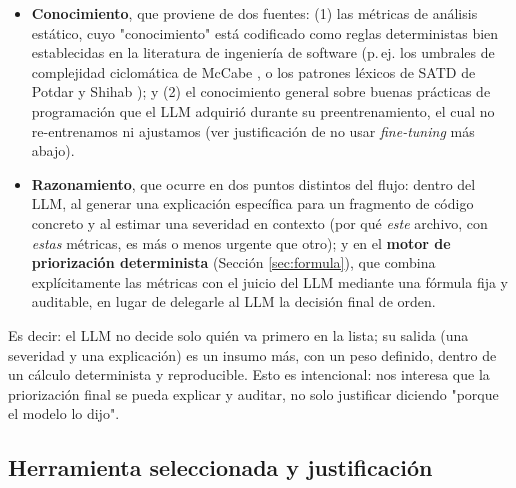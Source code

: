 \begin{itemize}
    \item \textbf{Conocimiento}, que proviene de dos fuentes: (1) las métricas de análisis estático, cuyo "conocimiento" está codificado como reglas deterministas bien establecidas en la literatura de ingeniería de software (p.\,ej. los umbrales de complejidad ciclomática de McCabe \parencite{McCabe1976}, o los patrones léxicos de SATD de Potdar y Shihab \parencite{PotdarShihab2014}); y (2) el conocimiento general sobre buenas prácticas de programación que el LLM adquirió durante su preentrenamiento, el cual no re-entrenamos ni ajustamos (ver justificación de no usar \textit{fine-tuning} más abajo).
    \item \textbf{Razonamiento}, que ocurre en dos puntos distintos del flujo: dentro del LLM, al generar una explicación específica para un fragmento de código concreto y al estimar una severidad en contexto (por qué \emph{este} archivo, con \emph{estas} métricas, es más o menos urgente que otro); y en el \textbf{motor de priorización determinista} (Sección \ref{sec:formula}), que combina explícitamente las métricas con el juicio del LLM mediante una fórmula fija y auditable, en lugar de delegarle al LLM la decisión final de orden.
\end{itemize}

Es decir: el LLM no decide solo quién va primero en la lista; su salida (una severidad y una explicación) es un insumo más, con un peso definido, dentro de un cálculo determinista y reproducible. Esto es intencional: nos interesa que la priorización final se pueda explicar y auditar, no solo justificar diciendo "porque el modelo lo dijo".

\subsection{Herramienta seleccionada y justificación}

